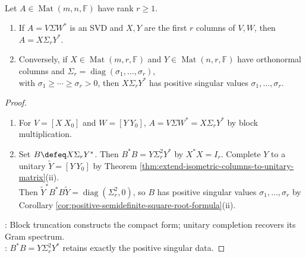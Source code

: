 \begin{theorem} \label{thm:compact-singular-value-decomposition} \\
Let $A\in\operatorname{Mat}(m,n,\mathbb{F})$ have rank $r\geq1$.
\begin{enumerate}[label=(\roman*)]
\setlength{\itemsep}{0pt}
\item If $A=V\Sigma W^*$ is an SVD and $X,Y$ are the first $r$ columns of $V,W$, then $A=X\Sigma_rY^*$.
\item Conversely, if $X\in\operatorname{Mat}(m,r,\mathbb{F})$ and $Y\in\operatorname{Mat}(n,r,\mathbb{F})$ have orthonormal columns and $\Sigma_r=\operatorname{diag}(\sigma_1,\ldots,\sigma_r)$,\\
with $\sigma_1\geq\cdots\geq\sigma_r>0$, then $X\Sigma_rY^*$ has positive singular values $\sigma_1,\ldots,\sigma_r$.
\end{enumerate}
\begin{proof}
\begin{enumerate}[label=(\roman*)]
\setlength{\itemsep}{0pt}
\item For $V=[X\ X_0]$ and $W=[Y\ Y_0]$, $A=V\Sigma W^*=X\Sigma_rY^*$ by block multiplication.
\item Set $B\defeq X\Sigma_rY^*$. Then $B^*B=Y\Sigma_r^2Y^*$ by $X^*X=I_r$. Complete $Y$ to a unitary $\widetilde Y=[Y\ Y_0]$ by Theorem \ref{thm:extend-isometric-columns-to-unitary-matrix}(ii).\\
Then $\widetilde Y^*B^*B\widetilde Y=\operatorname{diag}(\Sigma_r^2,0)$, so $B$ has positive singular values $\sigma_1,\ldots,\sigma_r$ by Corollary \ref{cor:positive-semidefinite-square-root-formula}(ii).
\end{enumerate}
: Block truncation constructs the compact form; unitary completion recovers its Gram spectrum.\\
: $B^*B=Y\Sigma_r^2Y^*$ retains exactly the positive singular data.
\end{proof}
\end{theorem}

